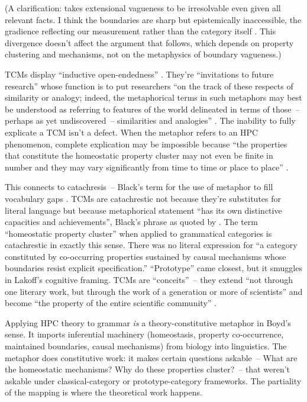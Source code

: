 \documentclass[12pt]{article}
\begin{document}
(A clarification: \textcite[526]{boyd1993metaphor} takes extensional vagueness to be irresolvable even given all relevant facts. I think the boundaries are sharp but epistemically inaccessible, the gradience reflecting our measurement rather than the category itself \citep{reynolds2025sorites, reynolds2025hpcbook}. This divergence doesn't affect the argument that follows, which depends on property clustering and mechanisms, not on the metaphysics of boundary vagueness.)

TCMs display \enquote{inductive open-endedness} \citep[363--364]{boyd1979}. They're \enquote{invitations to future research} whose function is to put researchers \enquote{on the track of these respects of similarity or analogy; indeed, the metaphorical terms in such metaphors may best be understood as referring to features of the world delineated in terms of those~-- perhaps as yet undiscovered~-- similarities and analogies} \citep[489]{boyd1993metaphor}. The inability to fully explicate a TCM isn't a defect. When the metaphor refers to an HPC phenomenon, complete explication may be impossible because \enquote{the properties that constitute the homeostatic property cluster may not even be finite in number and they may vary significantly from time to time or place to place} \citep[529]{boyd1993metaphor}.

This connects to catachresis~-- Black's term for the use of metaphor to fill vocabulary gaps \citep[356--357]{boyd1979}. TCMs are catachrestic not because they're substitutes for literal language but
because metaphorical statement \enquote{has its own distinctive capacities and
achievements}, Black's phrase as quoted by \textcite[482]{boyd1993metaphor}. The term \enquote{homeostatic property cluster} when applied to grammatical categories is catachrestic in exactly this sense. There was no literal expression for \enquote{a category constituted by co-occurring properties sustained by causal mechanisms whose boundaries resist explicit specification.} \enquote{Prototype} came closest, but it smuggles in Lakoff's cognitive framing. TCMs are \enquote{conceits}~-- they extend \enquote{not through one literary work, but through the work of a generation or more of scientists} and become \enquote{the property of the entire scientific community} \citep[361]{boyd1979}.

Applying HPC theory to grammar \emph{is} a theory-constitutive metaphor in Boyd's sense. It imports inferential machinery (homeostasis, property co-occurrence, maintained boundaries, causal mechanisms) from biology into linguistics. The metaphor does constitutive work: it makes certain questions askable~-- What are the homeostatic mechanisms? Why do these properties cluster?~-- that weren't askable under classical-category or prototype-category frameworks. The partiality of the mapping is where the theoretical work happens.
\end{document}
